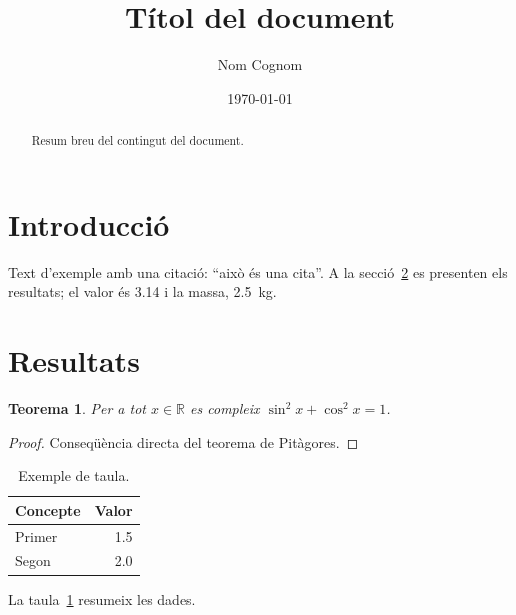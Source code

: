 \documentclass[a4paper,11pt]{article}
\title{Títol del document}
\author{Nom Cognom}
\date{\today}
\theoremstyle{plain}
\newtheorem{teorema}{Teorema}
\theoremstyle{definition}
\theoremstyle{remark}
\begin{document}
\maketitle

\begin{abstract}
Resum breu del contingut del document.
\end{abstract}

\tableofcontents

\section{Introducció}
\label{sec:introduccio}

Text d'exemple amb una citació: \enquote{això és una cita}. A la
secció~\ref{sec:resultats} es presenten els resultats; el valor és
\num{3,14} i la massa, \SI{2,5}{\kilo\gram}.

\section{Resultats}
\label{sec:resultats}

\begin{teorema}\label{thm:principal}
Per a tot $x\in\mathbb{R}$ es compleix $\sin^2 x + \cos^2 x = 1$.
\end{teorema}
\begin{proof}
Conseqüència directa del teorema de Pitàgores.
\end{proof}

\begin{table}[ht]
  \centering
  \caption{Exemple de taula.}
  \label{tab:exemple}
  \begin{tabular}{lr}
    \toprule
    Concepte & Valor \\
    \midrule
    Primer   & \num{1,5} \\
    Segon    & \num{2,0} \\
    \bottomrule
  \end{tabular}
\end{table}

La taula~\ref{tab:exemple} resumeix les dades.

\end{document}

